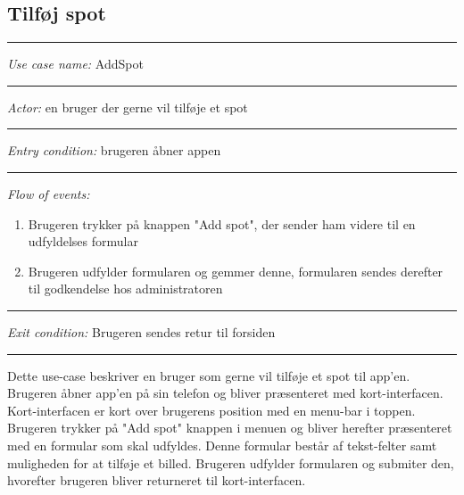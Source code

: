 \documentclass[12pt]{article}
\begin{document}
\subsection*{Tilføj spot}
\hrule\vspace{5mm}
\textit{Use case name:} AddSpot\\
\hrule\vspace{5mm}
\textit{Actor:} en bruger der gerne vil tilføje et spot\\
\hrule\vspace{5mm}
\textit{Entry condition:} brugeren åbner appen\\
\hrule\vspace{5mm}
\textit{Flow of events:}
\begin{enumerate}
\item Brugeren trykker på knappen "Add spot", der sender ham videre til en udfyldelses formular
\item Brugeren udfylder formularen og gemmer denne, formularen sendes derefter til godkendelse hos administratoren
\end{enumerate}
\hrule\vspace{5mm}
\textit{Exit condition:} Brugeren sendes retur til forsiden\\
\hrule\vspace{5mm}
Dette use-case beskriver en bruger som gerne vil tilføje et spot til app'en. Brugeren åbner app'en på sin telefon og 
bliver præsenteret med kort-interfacen. Kort-interfacen er kort over brugerens position med en menu-bar i toppen. Brugeren
trykker på "Add spot" knappen i menuen og bliver herefter præsenteret med en formular som skal udfyldes. Denne formular 
består af tekst-felter samt muligheden for at tilføje et billed. Brugeren udfylder formularen og submiter den, hvorefter
brugeren bliver returneret til kort-interfacen.
\newpage
\end{document}
